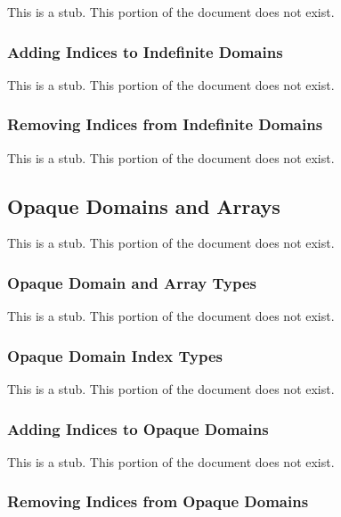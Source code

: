 This is a stub.  This portion of the document does not exist.

\subsubsection{Adding Indices to Indefinite Domains}
\label{Adding_Indices_to_Indefinite_Domains}

This is a stub.  This portion of the document does not exist.

\subsubsection{Removing Indices from Indefinite Domains}
\label{Removing_Indices_from_Indefinite_Domains}

This is a stub.  This portion of the document does not exist.

\subsection{Opaque Domains and Arrays}
\label{Opaque_Domains_and_Arrays}

This is a stub.  This portion of the document does not exist.

\subsubsection{Opaque Domain and Array Types}
\label{Opaque_Domain_and_Array_Types}

This is a stub.  This portion of the document does not exist.

\subsubsection{Opaque Domain Index Types}
\label{Opaque_Domain_Index_Types}

This is a stub.  This portion of the document does not exist.

\subsubsection{Adding Indices to Opaque Domains}
\label{Adding_Indices_to_Opaque_Domains}

This is a stub.  This portion of the document does not exist.

\subsubsection{Removing Indices from Opaque Domains}
\label{Removing_Indices_from_Opaque_Domains}

